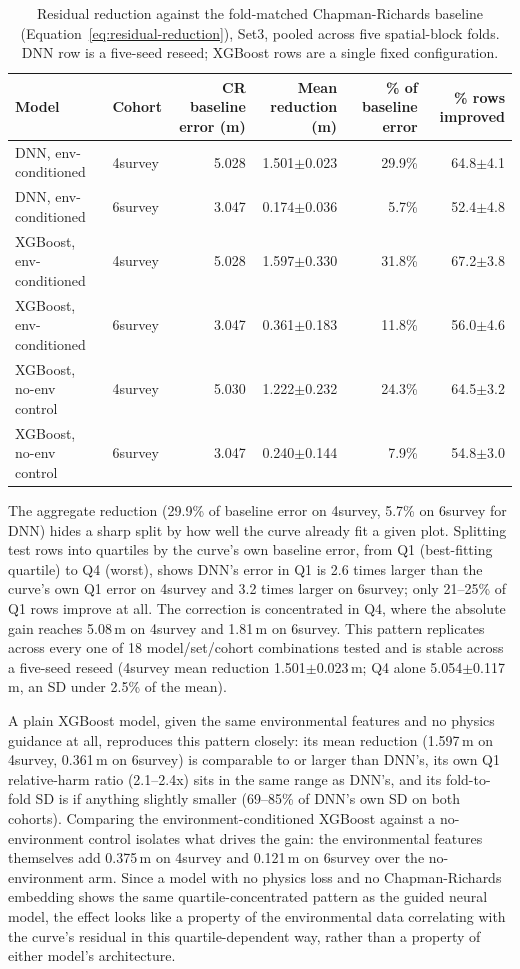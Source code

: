 \documentclass[11pt,a4paper]{report}
\begin{document}
\begin{table}[!htbp]
\centering
\scriptsize
\renewcommand{\arraystretch}{1.2}
\begin{tabular}{llrrrr}
\toprule
Model & Cohort & CR baseline error (m) & Mean reduction (m) & \% of baseline error & \% rows improved \\
\midrule
DNN, env-conditioned & 4survey & 5.028 & 1.501$\pm$0.023 & 29.9\% & 64.8$\pm$4.1 \\
DNN, env-conditioned & 6survey & 3.047 & 0.174$\pm$0.036 & 5.7\% & 52.4$\pm$4.8 \\
XGBoost, env-conditioned & 4survey & 5.028 & 1.597$\pm$0.330 & 31.8\% & 67.2$\pm$3.8 \\
XGBoost, env-conditioned & 6survey & 3.047 & 0.361$\pm$0.183 & 11.8\% & 56.0$\pm$4.6 \\
XGBoost, no-env control & 4survey & 5.030 & 1.222$\pm$0.232 & 24.3\% & 64.5$\pm$3.2 \\
XGBoost, no-env control & 6survey & 3.047 & 0.240$\pm$0.144 & 7.9\% & 54.8$\pm$3.0 \\
\bottomrule
\end{tabular}
\caption{Residual reduction against the fold-matched Chapman-Richards baseline
(Equation~\ref{eq:residual-reduction}), Set3, pooled across five spatial-block folds.
DNN row is a five-seed reseed; XGBoost rows are a single fixed configuration.}
\label{tab:results-rq2a}
\end{table}

The aggregate reduction (29.9\% of baseline error on 4survey, 5.7\% on 6survey for
DNN) hides a sharp split by how well the curve already fit a given plot. Splitting
test rows into quartiles by the curve's own baseline error, from Q1 (best-fitting
quartile) to Q4 (worst), shows DNN's error in Q1 is 2.6 times larger than the curve's
own Q1 error on 4survey and 3.2 times larger on 6survey; only 21--25\% of Q1 rows
improve at all. The correction is concentrated in Q4, where the absolute gain reaches
5.08\,m on 4survey and 1.81\,m on 6survey. This pattern replicates across every one of
18 model/set/cohort combinations tested and is stable across a five-seed reseed
(4survey mean reduction 1.501$\pm$0.023\,m; Q4 alone 5.054$\pm$0.117\,m, an SD under
2.5\% of the mean).

A plain XGBoost model, given the same environmental features and no physics guidance
at all, reproduces this pattern closely: its mean reduction (1.597\,m on 4survey,
0.361\,m on 6survey) is comparable to or larger than DNN's, its own Q1 relative-harm
ratio (2.1--2.4x) sits in the same range as DNN's, and its fold-to-fold SD is if
anything slightly smaller (69--85\% of DNN's own SD on both cohorts). Comparing the
environment-conditioned XGBoost against a no-environment control isolates what drives
the gain: the environmental features themselves add 0.375\,m on 4survey and 0.121\,m
on 6survey over the no-environment arm. Since a model with no physics loss and no
Chapman-Richards embedding shows the same quartile-concentrated pattern as the guided
neural model, the effect looks like a property of the environmental data correlating
with the curve's residual in this quartile-dependent way, rather than a property of
either model's architecture.
\end{document}
